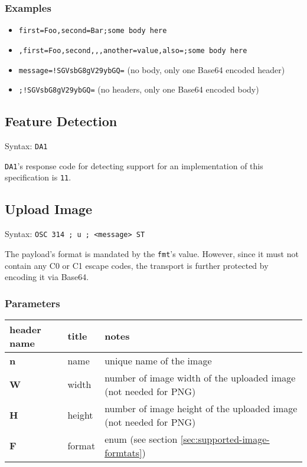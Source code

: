 \documentclass[a4paper]{article}
\newcommand{\code}[1]{\colorbox{light-gray}{\texttt{#1}}}
\newcommand{\DA}{\code{DA1}}
\begin{document}
\subsubsection*{Examples}

\begin{itemize}
    \item \code{first=Foo,second=Bar;some body here}
    \item \code{,first=Foo,second,,,another=value,also=;some body here}
    \item \code{message=!SGVsbG8gV29ybGQ=} (no body, only one Base64 encoded header)
    \item \code{;!SGVsbG8gV29ybGQ=} (no headers, only one Base64 encoded body)
\end{itemize}

\subsection{Feature Detection} %

Syntax: \DA

\DA's response code for detecting support for an implementation of this specification is \code{11}.

\subsection{Upload Image} %

Syntax: \code{OSC 314 ; u ; <message> ST}

The payload's format is mandated by the \code{fmt}'s value. However, since it must not contain
any C0 or C1 escape codes, the transport is further protected by encoding it via Base64.

\subsubsection*{Parameters}

\begin{tabular}{|m{3cm}|m{2cm}|m{11cm}|}
    \hline
    \textbf{header name}   & \textbf{title}   & \textbf{notes} \\
    \hline
    \textbf{n}             & name             & unique name of the image \\
    \textbf{W}             & width            & number of image width of the uploaded image (not needed for PNG) \\
    \textbf{H}             & height           & number of image height of the uploaded image (not needed for PNG) \\
    \textbf{F}             & format           & enum (see section \ref{sec:supported-image-formtats}) \\
    \hline
\end{tabular}
\end{document}
